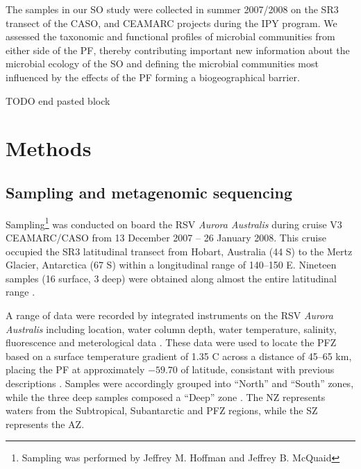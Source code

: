The samples in our \ac{SO} study were collected in summer 2007/2008 on the SR3 transect \cite{Sokolov:2002tc} of the \ac{CASO}, and \ac{CEAMARC} projects during the \ac{IPY} program.
We assessed the taxonomic and functional profiles of microbial communities from either side of the \ac{PF}, thereby contributing important new information about the microbial ecology of the \ac{SO} and defining the microbial communities most influenced by the effects of the \ac{PF} forming a biogeographical barrier. 

TODO end pasted block

\section{Methods}
\subsection{Sampling and metagenomic sequencing}

Sampling\footnote{Sampling was performed by Jeffrey M. Hoffman and Jeffrey B. McQuaid} was conducted on board the RSV \emph{Aurora Australis} during cruise V3 \ac{CEAMARC/CASO} from 13 December 2007 -- 26 January 2008. 
This cruise occupied the SR3 latitudinal transect from Hobart, Australia (44\textdegree{} S) to the Mertz Glacier, Antarctica (67\textdegree{} S) within a longitudinal range of 140--150\textdegree{} E.
Nineteen samples (16 surface, 3 deep) were obtained along almost the entire latitudinal range .



A range of data were recorded by integrated instruments on the RSV \emph{Aurora Australis} including location, water column depth, water temperature, salinity, fluorescence and meterological data .
These data were used to locate the \ac{PFZ} based on a surface temperature gradient of \textapprox{} 1.35 \textdegree{}C across a distance of 45--65 km, placing the \ac{PF} at approximately $-59.70$\textdegree{} of latitude, consistant with previous descriptions \cite{Moore:1999to,Sokolov:2002tc}.
Samples were accordingly grouped into ``North'' and ``South'' zones, while the three deep samples composed a ``Deep'' zone .
The \ac{NZ} represents waters from the Subtropical, Subantarctic and \ac{PFZ} regions, while the \ac{SZ} represents the \ac{AZ}.



